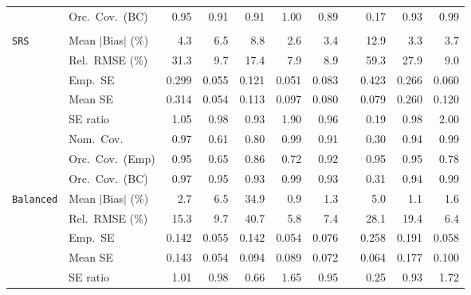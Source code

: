 \begin{landscape}
\begin{longtable}{llrrrrrrrrr}
 & Orc.\ Cov.\ (BC) & \cellcolor{rankone}0.95 & \cellcolor{rankthree}0.91 & \cellcolor{rankthree}0.91 & 1.00 & 0.89 &  & 0.17 & \cellcolor{ranktwo}0.93 & \cellcolor{rankthree}0.99 \\
\addlinespace[2pt]
\multicolumn{11}{l}{\textbf{Binary \& Categorical Phase-Two Covariates}} \\
\addlinespace[2pt]
\quad \texttt{SRS} & Mean $|$Bias$|$ (\%) & 4.3 & 6.5 & 8.8 & \cellcolor{rankone}2.6 & \cellcolor{rankthree}3.4 &  & 12.9 & \cellcolor{ranktwo}3.3 & 3.7 \\
 & Rel.\ RMSE (\%) & 31.3 & 9.7 & 17.4 & \cellcolor{rankone}7.9 & \cellcolor{ranktwo}8.9 &  & 59.3 & 27.9 & \cellcolor{rankthree}9.0 \\
 & Emp.\ SE & 0.299 & 0.055 & 0.121 & 0.051 & 0.083 &  & 0.423 & 0.266 & 0.060 \\
 & Mean SE & 0.314 & 0.054 & 0.113 & 0.097 & 0.080 &  & 0.079 & 0.260 & 0.120 \\
 & SE ratio & \cellcolor{rankthree}1.05 & \cellcolor{rankone}0.98 & 0.93 & 1.90 & \cellcolor{ranktwo}0.96 &  & 0.19 & \cellcolor{rankone}0.98 & 2.00 \\
 & Nom.\ Cov. & \cellcolor{ranktwo}0.97 & 0.61 & 0.80 & \cellcolor{rankthree}0.99 & \cellcolor{rankthree}0.91 &  & 0.30 & \cellcolor{rankone}0.94 & \cellcolor{rankthree}0.99 \\
 & Orc.\ Cov.\ (Emp) & \cellcolor{rankone}0.95 & 0.65 & \cellcolor{rankthree}0.86 & 0.72 & \cellcolor{ranktwo}0.92 &  & \cellcolor{rankone}0.95 & \cellcolor{rankone}0.95 & 0.78 \\
 & Orc.\ Cov.\ (BC) & \cellcolor{rankthree}0.97 & \cellcolor{rankone}0.95 & \cellcolor{rankthree}0.93 & 0.99 & \cellcolor{rankthree}0.93 &  & 0.31 & \cellcolor{ranktwo}0.94 & 0.99 \\
\addlinespace[2pt]
\quad \texttt{Balanced} & Mean $|$Bias$|$ (\%) & 2.7 & 6.5 & 34.9 & \cellcolor{rankone}0.9 & \cellcolor{rankthree}1.3 &  & 5.0 & \cellcolor{ranktwo}1.1 & 1.6 \\
 & Rel.\ RMSE (\%) & 15.3 & 9.7 & 40.7 & \cellcolor{rankone}5.8 & \cellcolor{rankthree}7.4 &  & 28.1 & 19.4 & \cellcolor{ranktwo}6.4 \\
 & Emp.\ SE & 0.142 & 0.055 & 0.142 & 0.054 & 0.076 &  & 0.258 & 0.191 & 0.058 \\
 & Mean SE & 0.143 & 0.054 & 0.094 & 0.089 & 0.072 &  & 0.064 & 0.177 & 0.100 \\
 & SE ratio & \cellcolor{rankone}1.01 & \cellcolor{ranktwo}0.98 & 0.66 & 1.65 & \cellcolor{rankthree}0.95 &  & 0.25 & 0.93 & 1.72 \\

\end{longtable}
\end{landscape}
